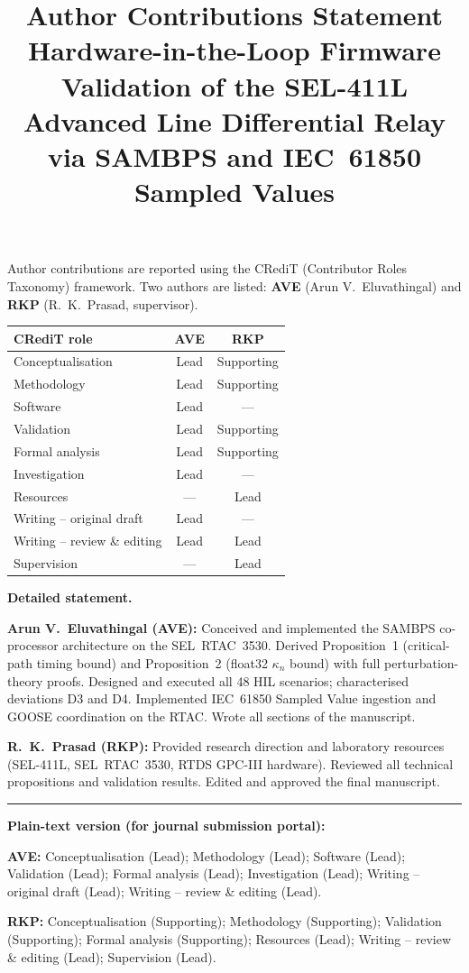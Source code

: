\documentclass[11pt,a4paper]{article}
\title{Author Contributions Statement\\[4pt]
       \large Hardware-in-the-Loop Firmware Validation of the SEL-411L\\
       Advanced Line Differential Relay via SAMBPS and IEC~61850 Sampled Values}
\author{}
\date{}
\begin{document}
\maketitle\thispagestyle{empty}

\noindent
Author contributions are reported using the CRediT (Contributor Roles Taxonomy)
framework.  Two authors are listed: \textbf{AVE} (Arun V.\ Eluvathingal) and
\textbf{RKP} (R.\ K.\ Prasad, supervisor).

\bigskip
\begin{tabular}{@{}lcc@{}}
\toprule
\textbf{CRediT role} & \textbf{AVE} & \textbf{RKP} \\
\midrule
Conceptualisation        & Lead   & Supporting \\
Methodology              & Lead   & Supporting \\
Software                 & Lead   & ---        \\
Validation               & Lead   & Supporting \\
Formal analysis          & Lead   & Supporting \\
Investigation            & Lead   & ---        \\
Resources                & ---    & Lead       \\
Writing -- original draft & Lead   & ---        \\
Writing -- review \& editing & Lead & Lead     \\
Supervision              & ---    & Lead       \\
\bottomrule
\end{tabular}

\bigskip
\noindent\textbf{Detailed statement.}

\medskip
\noindent\textbf{Arun V.\ Eluvathingal (AVE):}
Conceived and implemented the SAMBPS co-processor architecture on the SEL~RTAC~3530.
Derived Proposition~1 (critical-path timing bound) and Proposition~2
(float32 $\kappa_n$ bound) with full perturbation-theory proofs.
Designed and executed all 48 HIL scenarios; characterised deviations D3 and D4.
Implemented IEC~61850 Sampled Value ingestion and GOOSE coordination on the RTAC.
Wrote all sections of the manuscript.

\medskip
\noindent\textbf{R.\ K.\ Prasad (RKP):}
Provided research direction and laboratory resources (SEL-411L, SEL~RTAC~3530,
RTDS GPC-III hardware).
Reviewed all technical propositions and validation results.
Edited and approved the final manuscript.

\bigskip\bigskip
\noindent\rule{0.5\textwidth}{0.4pt}

\bigskip
\noindent\textbf{Plain-text version (for journal submission portal):}

\medskip
\begin{minipage}{\textwidth}\small
\textbf{AVE:} Conceptualisation (Lead); Methodology (Lead); Software (Lead);
Validation (Lead); Formal analysis (Lead); Investigation (Lead);
Writing -- original draft (Lead); Writing -- review \& editing (Lead).

\medskip
\textbf{RKP:} Conceptualisation (Supporting); Methodology (Supporting);
Validation (Supporting); Formal analysis (Supporting); Resources (Lead);
Writing -- review \& editing (Lead); Supervision (Lead).
\end{minipage}
\end{document}

